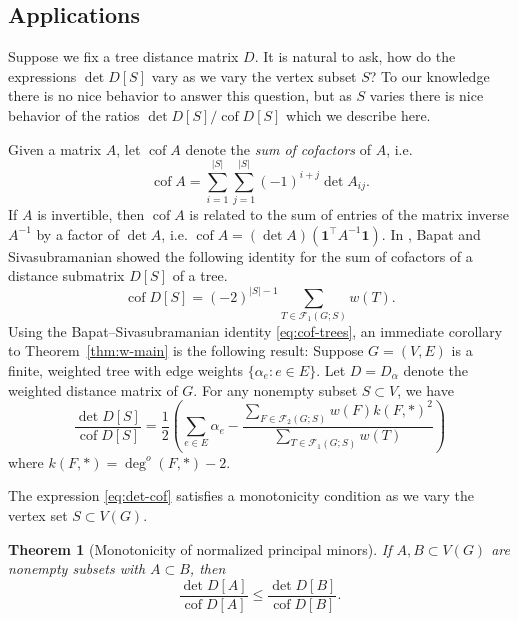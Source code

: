 \documentclass{amsart}
\newtheorem{thm}{Theorem}
\theoremstyle{definition}
\newcommand{\bone}{\mathbf{1}}
\newcommand{\tr}{\intercal}
\DeclareMathOperator{\cof}{cof}
\newcommand{\trees}{\mathcal{F}_1}
\newcommand{\forests}{\mathcal{F}}
\newcommand{\degout}{\deg^o}
\begin{document}
\subsection{Applications}
Suppose we fix a tree distance matrix $D$.
It is natural to ask, how do the expressions $\det D[S]$ vary as we vary the vertex subset $S$? 
To our knowledge there is no nice behavior to answer this question, but  as $S$ varies there is nice behavior of the ratios $\det D[S] / \cof D[S]$ which we describe here.

Given a matrix $A$, let $\cof A$ denote the {\em sum of cofactors} of $A$, i.e. 
\[
	\cof A = \sum_{i = 1}^{|S|} \sum_{j = 1}^{|S|} (-1)^{i + j} \det A_{ij} .
\]
If $A$ is invertible, then $\cof A$ is related to the sum of entries of the matrix inverse $A^{-1}$ by a factor of $\det A$, i.e. $\cof A = (\det A) (\bone^\tr A^{-1} \bone)$.
In \cite{bapat-sivasubramanian}, Bapat and Sivasubramanian showed the following identity for the sum of cofactors of a distance submatrix $D[S]$ of a tree.
\begin{equation}\label{eq:cof-trees}
	\cof D[S] = (-2)^{|S| - 1} \sum_{T \in \trees(G;S)} w(T) .
\end{equation}
Using the Bapat--Sivasubramanian identity \eqref{eq:cof-trees}, an immediate corollary to Theorem~\ref{thm:w-main} is the following result:
Suppose $G = (V,E)$ is a finite, weighted tree with edge weights $\{\alpha_e : e \in E\}$. Let $D = D_\alpha$ denote the weighted distance matrix of $G$. 
For any nonempty subset $S \subset V$, we have
\begin{equation}
\label{eq:det-cof}
	\frac{\det D[S]}{\cof D[S]} = \frac12 \left( \sum_{e \in E} \alpha_e - \frac{\sum_{F \in \forests_2(G; S)} w(F) k(F,*)^2}{\sum_{T \in \trees(G; S)} w(T)} \right)
\end{equation}
where $k(F,*) = \degout(F,*) - 2$.

The expression \eqref{eq:det-cof} satisfies a monotonicity condition as we vary the vertex set $S \subset V(G)$.

\begin{thm}[Monotonicity of normalized principal minors]
\label{thm:monotonic}
If $A,B \subset V(G)$
are nonempty subsets with
$A \subset B$,
then
\begin{equation*}
	\frac{\det D[A]}{\cof D[A]}  \leq \frac{\det D[B]}{\cof D[B]}.
\end{equation*}
\end{thm}
\end{document}
